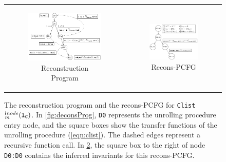 \begin{figure}
\begin{tabular}{cc}
\begin{subfigure}[b]{0.50\textwidth}
\includegraphics[scale=0.75]{chapters/figures/figClistCfg.pdf}
\caption{\label{fig:reconsProg}Reconstruction Program}
\end{subfigure}%
&
\begin{subfigure}[b]{0.50\textwidth}
\includegraphics[scale=0.75]{chapters/figures/figClistProductCfg.pdf}
\caption{\label{fig:reconsPCFG}Recons-PCFG}
\end{subfigure}%
\\
\end{tabular}
\vspace{-8px}
\caption{\label{fig:recons}The reconstruction program and the recons-PCFG for {\tt Clist$^{lnode}_m({\tt l_{C}})$}. In \cref{fig:deconsProg}, {\tt D0} represents the unrolling procedure entry node, and the square boxes show the transfer functions of the unrolling procedure (\cref{eqn:clist}). The dashed edges represent a recursive function call. In \cref{fig:reconsPCFG}, the square box to the right of node {\tt D0:D0} contains the inferred invariants for this recons-PCFG.}
\vspace{-8px}
\end{figure}
